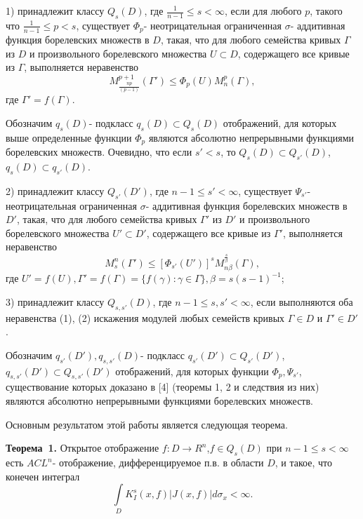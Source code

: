     1) принадлежит классу $Q_{s}(D)$, где $\frac{1}{n-1}\leqslant s<\infty$, если для любого $p$, такого что $\frac{1}{n-1}\leqslant p<s$, существует $\Phi_{p}$- неотрицательная ограниченная $\sigma$- аддитивная функция борелевских множеств в $D$, такая, что для любого семейства кривых $\Gamma$ из $D$ и произвольного борелевского множества $U\subset D$, содержащего все кривые из $\Gamma$, выполняется неравенство
 \begin{equation}\label{eq-1}
 	M_{\frac{np}{(p-1)}}^{p+1}(\Gamma')\leqslant\Phi_{p}(U)M^{p}_{n}(\Gamma),
 \end{equation}
где $\Gamma'=f(\Gamma)$.

Обозначим $q_{s}(D)$- подкласс $q_{s}(D)\subset Q_{s}(D)$ отображений, для которых выше определенные функции $\Phi_{p}$ являются абсолютно непрерывными функциями борелевских множеств. Очевидно, что если $s'<s$, то $Q_{s}(D)\subset Q_{s'}(D)$, $q_{s}(D)\subset q_{s'}(D)$.

2) принадлежит классу $Q_{s'}(D')$, где $n-1\leqslant s'<\infty$, существует $\Psi_{s'}$- неотрицательная ограниченная $\sigma$- аддитивная функция борелевских множеств в $D'$, такая, что для любого семейства кривых $\Gamma'$ из $D'$ и произвольного борелевского множества $U'\subset D'$, содержащего все кривые из $\Gamma'$, выполняется неравенство
\begin{equation}\label{eq-2}
M_{s}^{n}(\Gamma')\leqslant[\Phi_{s'}(U')]^{s}M^{\frac{s}{\beta}}_{n\beta}(\Gamma),
\end{equation}
где $U'=f(U),\Gamma'=f(\Gamma)=\{f(\gamma):\gamma\in\Gamma\},\beta=s(s-1)^{-1}$;

3) принадлежит классу $Q_{s,s'}(D)$, где $n-1\leqslant s,s'<\infty$, если выполняются оба неравенства (1), (2) искажения модулей любых семейств кривых $\Gamma\in D$ и $\Gamma'\in D'$.

Обозначим $q_{s'}(D'),q_{s,s'}(D)$- подкласс $q_{s'}(D')\subset Q_{s'}(D')$, $q_{s,s'}(D')\subset Q_{s,s'}(D')$ отображений, для которых функции $\Phi_{p},\Psi_{s'}$, существование которых доказано в [4] (теоремы 1, 2 и следствия из них) являются абсолютно непрерывными функциями борелевских множеств.

Основным результатом этой работы является следующая теорема.


\textbf{Теорема~1.} Открытое отображение $f:D\rightarrow R^{n}$,$f\in Q_{s}(D)$ при $n-1\leqslant s<\infty$ есть $ACL^{n}$- отображение, дифференцируемое п.в. в области $D$, и такое, что конечен интеграл
\begin{equation*}
\int\limits_{D}K^{s}_{I}(x,f)|J(x,f)|d\sigma_{x}<\infty.
\end{equation*}


